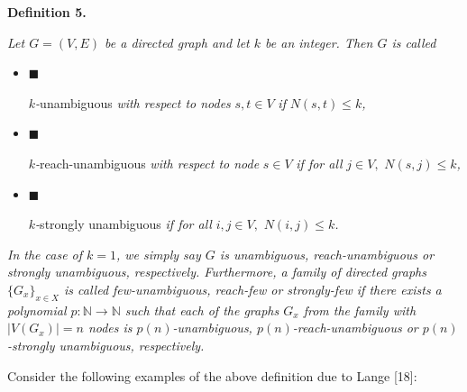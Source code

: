 

\par\medskip\noindent\textbf{
\textbf{Definition 5}\textbf{.}
}\par



\emph{Let $G=(V,E)$ be a directed graph and let $k$ be an integer. Then $G$ is called}\par


\begin{itemize}


\item[] 
$\blacksquare$ 


$k$\emph{-}unambiguous\emph{ with respect to nodes }$s,t\in V$\emph{ if }$N(s,t)\leq k$\emph{,}\par





\item[] 
$\blacksquare$ 


$k$\emph{-}reach-unambiguous\emph{ with respect to node }$s\in V$\emph{ if for all }$j\in V,$\emph{ }$N(s,j)\leq k$\emph{,}\par





\item[] 
$\blacksquare$ 


$k$\emph{-}strongly unambiguous\emph{ if for all }$i,j\in V,$\emph{ }$N(i,j)\leq k$\emph{.}\par





\end{itemize}


\emph{In the case of $k=1$, we simply say $G$ is unambiguous, reach-unambiguous or strongly unambiguous, respectively.
Furthermore, a family of directed graphs $\{G_{x}\}_{x\in X}$ is called few-unambiguous, reach-few or strongly-few if there exists a polynomial $p:\mathbb{N}\rightarrow\mathbb{N}$ such that each of the graphs $G_{x}$ from the family with $|V(G_{x})|=n$ nodes is $p(n)$-unambiguous, $p(n)$-reach-unambiguous or $p(n)$-strongly unambiguous, respectively.}\par






Consider the following examples of the above definition due to Lange [18]:\par





